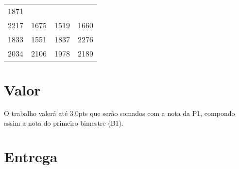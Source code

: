 \documentclass[a4paper]{article}
\begin{document}
\begin{longtable}[c]{@{}cccc@{}}
\begin{minipage}[t]{0.06\columnwidth}
1871
\strut\end{minipage}\tabularnewline
\begin{minipage}[t]{0.06\columnwidth}\centering\strut
2217
\strut\end{minipage} &
\begin{minipage}[t]{0.06\columnwidth}\centering\strut
1675
\strut\end{minipage} &
\begin{minipage}[t]{0.06\columnwidth}\centering\strut
1519
\strut\end{minipage} &
\begin{minipage}[t]{0.06\columnwidth}\centering\strut
1660
\strut\end{minipage}\tabularnewline
\begin{minipage}[t]{0.06\columnwidth}\centering\strut
1833
\strut\end{minipage} &
\begin{minipage}[t]{0.06\columnwidth}\centering\strut
1551
\strut\end{minipage} &
\begin{minipage}[t]{0.06\columnwidth}\centering\strut
1837
\strut\end{minipage} &
\begin{minipage}[t]{0.06\columnwidth}\centering\strut
2276
\strut\end{minipage}\tabularnewline
\begin{minipage}[t]{0.06\columnwidth}\centering\strut
2034
\strut\end{minipage} &
\begin{minipage}[t]{0.06\columnwidth}\centering\strut
2106
\strut\end{minipage} &
\begin{minipage}[t]{0.06\columnwidth}\centering\strut
1978
\strut\end{minipage} &
\begin{minipage}[t]{0.06\columnwidth}\centering\strut
2189
\strut\end{minipage}\tabularnewline
\bottomrule
\end{longtable}

\section{Valor}
O trabalho valerá até $3.0$pts que serão somados com a nota da P1, compondo assim a nota do primeiro bimestre (B1).

\section{Entrega}
\end{document}
